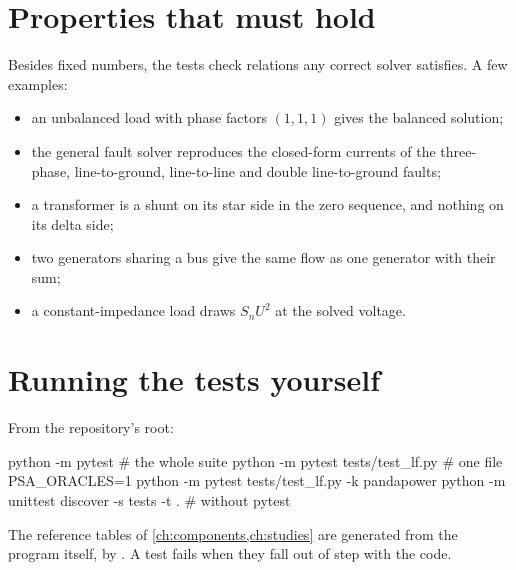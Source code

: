 \section{Properties that must hold}

Besides fixed numbers, the tests check relations any correct solver satisfies. A few
examples:
\begin{itemize}
  \item an unbalanced load with phase factors $(1, 1, 1)$ gives the balanced solution;
  \item the general fault solver reproduces the closed-form currents of the
    three-phase, line-to-ground, line-to-line and double line-to-ground faults;
  \item a  transformer is a shunt on its star side in the zero sequence, and
    nothing on its delta side;
  \item two generators sharing a bus give the same flow as one generator with their sum;
  \item a constant-impedance load draws $S_n U^2$ at the solved voltage.
\end{itemize}

\section{Running the tests yourself}

From the repository's root:

\begin{terminal}
python -m pytest                            # the whole suite
python -m pytest tests/test_lf.py           # one file
PSA_ORACLES=1 python -m pytest tests/test_lf.py -k pandapower
python -m unittest discover -s tests -t .   # without pytest
\end{terminal}

The reference tables of \cref{ch:components,ch:studies} are generated from the program
itself, by . A test fails when they fall out of step with the
code.
